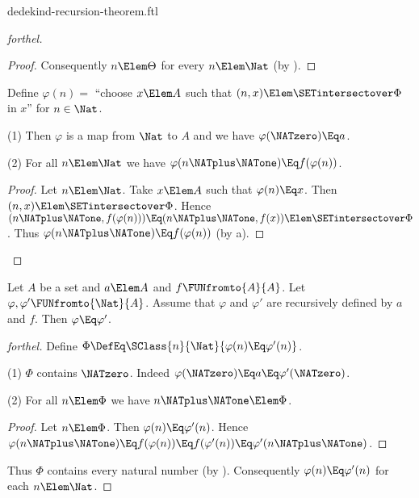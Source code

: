 \documentclass{stex}
\begin{document}
\begin{smodule}{dedekind-recursion-theorem.ftl}
\begin{proof}[forthel]
\begin{proof}
    Consequently $n \Elem \Theta$ for every $n \Elem \Nat$ (by ).
  \end{proof}

  Define $\varphi(n) =$ ``choose $x \Elem A$ such that $(n, x) \Elem
  \SETintersectover \Phi$ in $x$'' for $n \in \Nat$.

  (1) Then $\varphi$ is a map from $\Nat$ to $A$ and we have
  $\varphi(\NATzero) \Eq a$.

  (2) For all $n \Elem \Nat$ we have $\varphi(n \NATplus \NATone) \Eq
  f(\varphi(n))$.
  \begin{proof}
    Let $n \Elem \Nat$.
    Take $x \Elem A$ such that $\varphi(n) \Eq x$.
    Then $(n, x) \Elem \SETintersectover \Phi$.
    Hence $(n \NATplus \NATone, f(\varphi(n))) \Eq (n \NATplus \NATone, f(x)) \Elem \SETintersectover \Phi$.
    Thus $\varphi(n \NATplus \NATone) \Eq f(\varphi(n))$ (by a).
  \end{proof}
\end{proof}


\begin{theorem}[forthel,title=Dedekind's Recursion Theorem: Uniqueness,name=Dedekind Recursion Uniqueness]
  Let $A$ be a set and $a \Elem A$ and $f \FUNfromto{A}{A}$.
  Let $\varphi, \varphi' \FUNfromto{\Nat}{A}$.
  Assume that $\varphi$ and $\varphi'$ are recursively defined by $a$ and
  $f$.
  Then $\varphi \Eq \varphi'$.
\end{theorem}
\begin{proof}[forthel]
  Define $\Phi \DefEq \SClass{n}{\Nat}{\varphi(n) \Eq \varphi'(n)}$.

  (1) $\Phi$ contains $\NATzero$.
  Indeed $\varphi(\NATzero) \Eq a \Eq \varphi'(\NATzero)$.

  (2) For all $n \Elem \Phi$ we have $n \NATplus \NATone \Elem \Phi$.
  \begin{proof}
    Let $n \Elem \Phi$.
    Then $\varphi(n) \Eq \varphi'(n)$.
    Hence $\varphi(n \NATplus \NATone)
      \Eq f(\varphi(n))
      \Eq f(\varphi'(n))
      \Eq \varphi'(n \NATplus \NATone)$.
    \end{proof}

  Thus $\Phi$ contains every natural number (by ).
  Consequently $\varphi(n) \Eq \varphi'(n)$ for each $n \Elem \Nat$.
\end{proof}
\end{smodule}
\end{document}
